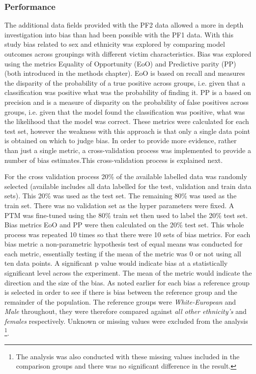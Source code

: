 \subsubsection{Performance} The additional data fields provided with the PF2 data allowed a more in depth investigation into bias than had been possible with the PF1 data. With this study bias related to sex and ethnicity was explored by comparing model outcomes across groupings with different victim characteristics. Bias was explored using the metrics Equality of Opportunity (EoO) and Predictive parity (PP) (both introduced in the methods chapter). EoO is based on recall and measures the disparity of the probability of a true positive across groups, i.e. given that a classification was positive what was the probability of finding it.  PP is a based on precision and is a measure of disparity on the probability of false positives across groups, i.e. given that the model found the classification was positive, what was the likelihood that the model was correct. These metrics were calculated for each test set, however the weakness with this approach is that only a single data point is obtained on which to judge bias. In order to provide more evidence, rather than just a single metric, a cross-validation process was implemented to provide a number of bias estimates.This cross-validation process is explained next. 

For the cross validation process 20\% of the available labelled data was randomly selected (available includes all data labelled for the test, validation and train data sets). This 20\% was used as the test set. The remaining 80\% was used as the train set. There was no validation set as the hyper parameters were fixed. A PTM was fine-tuned using the 80\% train set then used to label the 20\% test set. Bias metrics EoO and PP were then calculated on the  20\% test set. This whole process was repeated 10 times so that there were 10 sets of bias metrics. For each bias metric a non-parametric hypothesis test of equal means was conducted for each metric, essentially testing if the mean of the metric was 0 or not using all ten data points. A significant p value would indicate bias at a statistically significant level across the experiment. The mean of the metric would indicate the direction and the size of the bias. As noted earlier for each bias a reference group is selected in order to see if there is bias between the reference group and the remainder of the population. The reference groups were \emph{White-European} and \emph{Male} throughout, they were therefore compared against \emph{all other ethnicity's} and \emph{females} respectively. Unknown or missing values were excluded from the analysis \footnote{The analysis was also conducted with these missing values included in the comparison groups and there was no significant difference in the result.}. 

